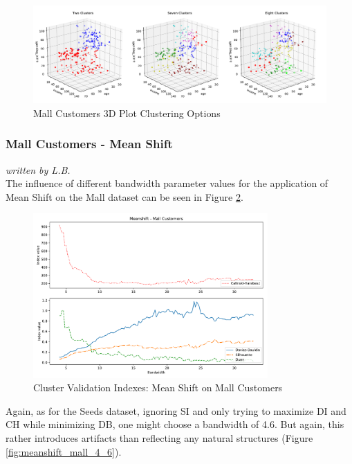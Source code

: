 \begin{figure}[h]
\caption{Mall Customers 3D Plot Clustering Options}
\begin{center}
\includegraphics[width=1.0\textwidth]{images/kmeans_mall_3d_multi.pdf}
\end{center}
\label{fig:kmeans_customers_3d_multi}
\end{figure}
\vspace{-0.5cm}


\subsubsection{Mall Customers - Mean Shift}
\textit{written by L.B.}\\

The influence of different bandwidth parameter values for the application of Mean Shift on the Mall dataset can be seen in Figure \ref{fig:meanshift_mall}.

\begin{figure}[!ht]
\caption{Cluster Validation Indexes: Mean Shift on Mall Customers}
\begin{center}
\includegraphics[width=0.8\textwidth]{images/Meanshift_-_Mall_Customers.pdf}
\end{center}
\label{fig:meanshift_mall}
\end{figure}
Again, as for the Seeds dataset, ignoring SI and only trying to maximize DI and CH while minimizing DB, one might choose a bandwidth of 4.6. But again, this rather introduces artifacts than reflecting any natural structures (Figure \ref{fig:meanshift_mall_4_6}).

